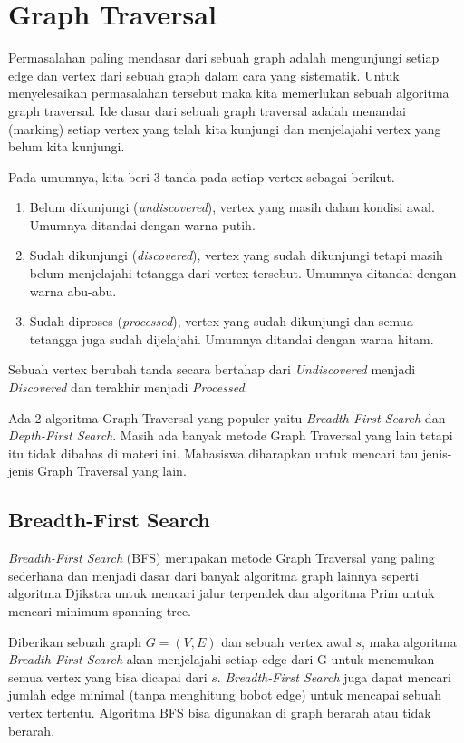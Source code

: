 \chapter{Graph Traversal}

Permasalahan paling mendasar dari sebuah graph adalah mengunjungi setiap edge dan vertex dari sebuah graph dalam cara yang sistematik. Untuk menyelesaikan permasalahan tersebut maka kita memerlukan sebuah algoritma graph traversal. Ide dasar dari sebuah graph traversal adalah menandai (marking) setiap vertex yang telah kita kunjungi dan menjelajahi vertex yang belum kita kunjungi.

Pada umumnya, kita beri 3 tanda pada setiap vertex sebagai berikut.
\begin{enumerate}
	\item Belum dikunjungi (\textit{undiscovered}), vertex yang masih dalam kondisi awal. Umumnya ditandai dengan warna putih.
	\item Sudah dikunjungi (\textit{discovered}), vertex yang sudah dikunjungi tetapi masih belum menjelajahi tetangga dari vertex tersebut. Umumnya ditandai dengan warna abu-abu.
	\item Sudah diproses (\textit{processed}), vertex yang sudah dikunjungi dan semua tetangga juga sudah dijelajahi. Umumnya ditandai dengan warna hitam.
\end{enumerate}

Sebuah vertex berubah tanda secara bertahap dari \textit{Undiscovered} menjadi \textit{Discovered} dan terakhir menjadi \textit{Processed}. 

Ada 2 algoritma Graph Traversal yang populer yaitu \textit{Breadth-First Search} dan \textit{Depth-First Search}. Masih ada banyak metode Graph Traversal yang lain tetapi itu tidak dibahas di materi ini. Mahasiswa diharapkan untuk mencari tau jenis-jenis Graph Traversal yang lain.

\section{Breadth-First Search}

\textit{Breadth-First Search} (BFS) merupakan metode Graph Traversal yang paling sederhana dan menjadi dasar dari banyak algoritma graph lainnya seperti algoritma Djikstra untuk mencari jalur terpendek dan algoritma Prim untuk mencari minimum spanning tree.

Diberikan sebuah graph $G = (V,E)$ dan sebuah vertex awal $s$, maka algoritma \textit{Breadth-First Search} akan menjelajahi setiap edge dari G untuk menemukan semua vertex yang bisa dicapai dari $s$. \textit{Breadth-First Search} juga dapat mencari jumlah edge minimal (tanpa menghitung bobot edge) untuk mencapai sebuah vertex tertentu. Algoritma BFS bisa digunakan di graph berarah atau tidak berarah.

